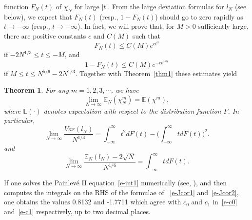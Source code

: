 \documentclass{amsart}
\newtheorem{thm}{Theorem}[section]
\theoremstyle{definition}
\theoremstyle{remark}
\numberwithin{equation}{section}
\newcommand{\E}{\mathbb E}
\begin{document}
function $F_N(t)$ of $\chi_N$ for large $|t|$. From the large
deviation formulas for $l_N$ (see below), we expect that $F_N(t)$
(resp., $1-F_N(t)$) 
should go to zero rapidly as $t\to-\infty$ (resp., $t\to+\infty$). 
In fact, we will prove that, for
$M>0$ sufficiently large, there are positive constants $c$ and $C(M)$
such that
\begin{equation}\label{e-J1.6a'}
F_N(t)\le C(M)e^{ct^3}     %
\end{equation}
if $-2N^{1/3}\le t\le -M$, and
\begin{equation}\label{e-J1.6b'}
1-F_N(t)\le C(M)e^{-ct^{3/5}}   %
\end{equation}
if $M\le t\le N^{5/6}-2N^{1/3}$.
Together with Theorem~\ref{thm1}  these estimates yield 
\begin{thm}\label{thm2}
   For any $m=1,2,3,\cdots$, we have
\begin{equation*}
   \lim_{N\to\infty} \E_N(\chi_N^m)= \E(\chi^m),
\end{equation*}
where $\E(\cdot)$ denotes expectation with respect to the distribution
function $F$. In particular,
 \begin{equation}\label{e-Jcor1}
      \lim_{N\to\infty} \frac{Var(l_N)}{N^{1/3}} =
\int_{-\infty}^{\infty} t^2dF(t) -
\biggl( \int_{-\infty}^{\infty} tdF(t) \biggr)^2.
  \end{equation}
and
\begin{equation}\label{e-Jcor2}
  \lim_{N\to\infty} \frac{\E_N(l_N)-2\sqrt{N}}{N^{1/6}} =
\int_{-\infty}^{\infty} tdF(t).
\end{equation}
\end{thm}
If one solves the Painlev\'e II equation~\eqref{e-int1} numerically 
(see, \cite{TW}), and then 
computes the integrals on the RHS of the formulae of ~\eqref{e-Jcor1} 
and~\eqref{e-Jcor2}, one obtains the values 0.8132 and -1.7711 
which agree with 
$c_0$ and $c_1$ in~\eqref{e-c0} and~\eqref{e-c1} respectively, 
up to two decimal places.
\end{document}
